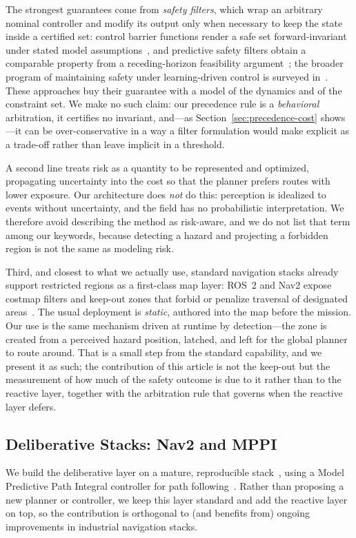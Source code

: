 The strongest guarantees come from \emph{safety filters}, which wrap an arbitrary
nominal controller and modify its output only when necessary to keep the state inside
a certified set: control barrier functions render a safe set forward-invariant under
stated model assumptions~\cite{ames2019cbf}, and predictive safety filters obtain a
comparable property from a receding-horizon feasibility
argument~\cite{wabersich2021filter}; the broader program of maintaining safety
under learning-driven control is surveyed in~\cite{brunke2022safe}. These approaches
buy their guarantee with a model of the dynamics and of the constraint set. We make
no such claim: our precedence rule is a \emph{behavioral} arbitration, it certifies
no invariant, and---as Section~\ref{sec:precedence-cost} shows---it can be
over-conservative in a way a filter formulation would make explicit as a trade-off
rather than leave implicit in a threshold.

A second line treats risk as a quantity to be represented and optimized, propagating
uncertainty into the cost so that the planner prefers routes with lower exposure.
Our architecture does \emph{not} do this: perception is idealized to events without
uncertainty, and the field has no probabilistic interpretation. We therefore avoid
describing the method as risk-aware, and we do not list that term among our keywords,
because detecting a hazard and projecting a forbidden region is not the same as
modeling risk.

Third, and closest to what we actually use, standard navigation stacks already
support restricted regions as a first-class map layer: ROS~2 and Nav2 expose costmap
filters and keep-out zones that forbid or penalize traversal of designated
areas~\cite{macenski2020nav2,macenski2022ros2,macenski2023survey}. The usual
deployment is \emph{static}, authored into the map before the mission. Our use is the
same mechanism driven at runtime by detection---the zone is created from a perceived
hazard position, latched, and left for the global planner to route around. That is a
small step from the standard capability, and we present it as such; the contribution
of this article is not the keep-out but the measurement of how much of the safety
outcome is due to it rather than to the reactive layer, together with the arbitration
rule that governs when the reactive layer defers.

\subsection{Deliberative Stacks: Nav2 and MPPI}
We build the deliberative layer on a mature, reproducible
stack~\cite{macenski2020nav2}, using a Model Predictive Path Integral
controller for path following~\cite{williams2017mppi}. Rather than proposing a
new planner or controller, we keep this layer standard and add the reactive
layer on top, so the contribution is orthogonal to (and benefits
from) ongoing improvements in industrial navigation stacks.

